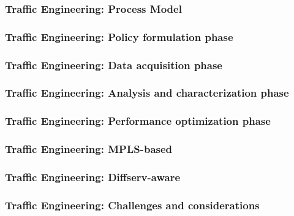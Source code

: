 \documentclass[12pt]{beamer}
\begin{document}
\begin{frame}
  \frametitle{Traffic Engineering: Process Model}
\end{frame}

\begin{frame}
  \frametitle{Traffic Engineering: Policy formulation phase}
\end{frame}

\begin{frame}
  \frametitle{Traffic Engineering: Data acquisition phase}
\end{frame}

\begin{frame}
  \frametitle{Traffic Engineering: Analysis and characterization phase}
\end{frame}

\begin{frame}
  \frametitle{Traffic Engineering: Performance optimization phase}
\end{frame}

\begin{frame}
  \frametitle{Traffic Engineering: MPLS-based}
\end{frame}

\begin{frame}
  \frametitle{Traffic Engineering: Diffserv-aware}
\end{frame}

\begin{frame}
  \frametitle{Traffic Engineering: Challenges and considerations}
\end{frame}
\end{document}
